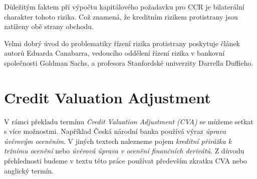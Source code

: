 \documentclass[a4paper,12pt]{report}
\theoremstyle{definition} \newtheorem{definice}[veta]{Definice}
\theoremstyle{remark}
\begin{document}
Důležitým faktem při výpočtu kapitálového požadavku pro CCR je  bilaterální charakter tohoto rizika. Což znamená, že kreditním rizikem protistrany jsou zatíženy obě strany obchodu.

Velmi dobrý úvod do problematiky řízení rizika protistrany poskytuje článek \cite{canabarro2003measuring} autorů Eduarda Canabarra, vedoucího oddělení řízení rizika v bankovní společnosti Goldman Sachs, a profesora Stanfordské univerzity Darrella Duffieho.

\section{Credit Valuation Adjustment}\label{CVA_kap}
V rámci překladu termínu \textit{Credit Valuation Adjustment (CVA)}  se můžeme setkat s více možnostmi.
Například Česká národní banka používá výraz \textit{úprava úvěrovým oceněním}.
V jiných textech nalezneme pojem  \textit{kreditní přirážka k tržnímu ocenění} nebo \textit{úvěrová úprava v ocenění finančních derivátů}.
Z důvodu přehlednosti budeme v textu této práce používat především zkratku CVA nebo anglický termín.
\end{document}
